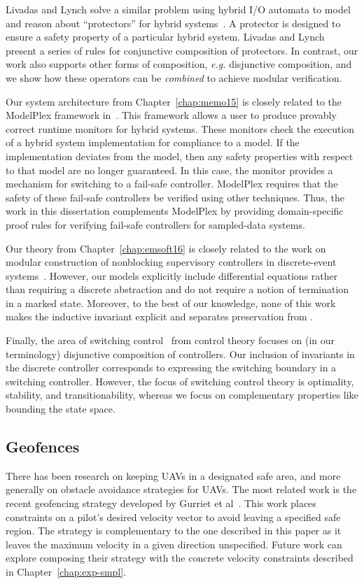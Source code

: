Livadas and Lynch solve a similar problem using hybrid I/O automata to
model and reason about ``protectors'' for hybrid systems~\cite{LivadasL98}.
A protector is designed to ensure a safety property of a particular hybrid
system. Livadas and Lynch present a series of rules for conjunctive
composition of protectors.  In contrast, our work also supports other forms
of composition, \textit{e.g.} disjunctive composition, and we show how
these operators can be \emph{combined} to achieve modular verification.

Our system architecture from Chapter~\ref{chap:memo15} is closely related
to the ModelPlex framework in~\cite{mitsch2014modelplex}. This framework
allows a user to produce provably correct runtime monitors for hybrid
systems. These monitors check the execution of a hybrid system
implementation for compliance to a model. If the implementation deviates
from the model, then any safety properties with respect to that model are
no longer guaranteed. In this case, the monitor provides a mechanism for
switching to a fail-safe controller. ModelPlex requires that the safety of
these fail-safe controllers be verified using other techniques. Thus, the
work in this dissertation complements ModelPlex by providing
domain-specific proof rules for verifying fail-safe controllers for
sampled-data systems.

Our theory from Chapter~\ref{chap:emsoft16} is closely related to the work
on modular construction of nonblocking supervisory controllers in
discrete-event systems~\cite{wonham1988supervisory}.  However, our
models explicitly include differential equations rather than requiring a
discrete abstraction and do not require a notion of termination in a marked
state.  Moreover, to the best of our knowledge, none of this work makes the
inductive invariant explicit and separates preservation from \progress{}.

Finally, the area of switching control~\cite{liberzon2012switching} from
control theory focuses on (in our terminology) disjunctive composition of
controllers.  Our inclusion of invariants in the discrete controller
corresponds to expressing the switching boundary in a switching controller.
However, the focus of switching control theory is optimality, stability,
and transitionability, whereas we focus on complementary properties like
bounding the state space.

\subsection{Geofences}
There has been research on keeping UAVs in a designated safe area, and more
generally on obstacle avoidance strategies for UAVs. The most related work
is the recent geofencing strategy developed by Gurriet et
al~\cite{gurriet16geofence}. This work places constraints on a pilot's
desired velocity vector to avoid leaving a specified safe region. The
strategy is complementary to the one described in this paper as it leaves
the maximum velocity in a given direction unspecified. Future work can
explore composing their strategy with the concrete velocity constraints
described in Chapter~\ref{chap:exp-smpl}.

